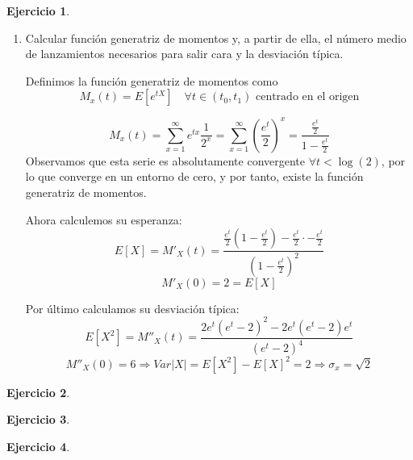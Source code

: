 \documentclass[a4paper, 12pt]{article}
\theoremstyle{definition}
\newtheorem{ej}{Ejercicio}
\begin{document}
\begin{ej}
\begin{enumerate}[label=\textit{\alph*)}]
	\item Calcular función generatriz de momentos y, a partir de ella, el número medio de lanzamientos necesarios para salir cara y la desviación típica.
	
Definimos la función generatriz de momentos como
\[
M_x(t) = E[e^{tX}] \quad \forall t \in (t_0, t_1) \text{ centrado en el origen}
\]

\[
	M_x(t) = \sum_{x=1}^{\infty} e^{tx} \frac{1}{2^x} = \sum_{x=1}^{\infty} \left( \frac{e^t}{2} \right)^x = \frac{\frac{e^t}{2}}{1- \frac{e^t}{2}}
\]
Observamos que esta serie es absolutamente convergente \(\forall t < \log (2)\), por lo que converge en un entorno de cero, y por tanto, existe la función generatriz de momentos.

Ahora calculemos su esperanza:
\[
	E[X] = M'_X(t) = \frac{\frac{e^t}{2}(1-\frac{e^t}{2}) - \frac{e^t}{2} \cdot - \frac{e^t}{2}}{(1-\frac{e^t}{2})^2}
\]
\[
	M'_X(0) = 2 = E[X]
\]

Por último calculamos su desviación típica:
\[
	E[X^2] = M''_X(t) = \frac{2e^t (e^t -2)^2 - 2e^t (e^t-2)e^t}{(e^t-2)^4}
\]
\[
	M''_X(0) = 6 \Rightarrow Var|X| = E[X^2] - E[X]^2 = 2 \Rightarrow \sigma_x = \sqrt{2}
\]

\end{enumerate}

\end{ej}

\begin{ej}

\end{ej}

\begin{ej}

\end{ej}

\begin{ej}

\end{ej}
\end{document}
